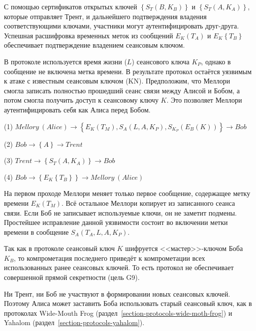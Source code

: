 С помощью сертификатов открытых ключей $\left\{ S_T \left( B, K_B \right) \right\}$ и $\left\{ S_T \left( A, K_A \right) \right\}$, которые отправляет Трент, и дальнейшего подтверждения владения соответствующими ключами, участники могут аутентифицировать друг-друга. Успешная расшифровка временных меток из сообщений $E_K \left( T_A \right)$ и $E_K \left\{ T_B \right\}$ обеспечивает подтверждение владением сеансовым ключом.

В протоколе используется время жизни ($L$) сеансового ключа $K_P$, однако в сообщение не включена метка времени. В результате протокол остаётся уязвимым к атаке с известным сеансовым ключом (KN). Предположим, что Меллори смогла записать полностью прошедший сеанс связи между Алисой и Бобом, а потом смогла получить доступ к сеансовому ключу $K$. Это позволяет Меллори аутентифицировать себя как Алиса перед Бобом.

\begin{protocol}
    \item[(1)] $Mellory~(Alice) \to \left\{ E_K \left( T_M \right), S_A \left( L, A, K_P \right), S_{K_P} \left( E_B \left( K \right) \right) \right\} \to Bob$
    \item[(2)] $Bob \to \left\{ A \right\} \to Trent$
    \item[(3)] $Trent \to \left\{ S_T \left( A, K_A \right) \right\} \to Bob$
    \item[(4)] $Bob \to \left\{ E_K \left\{ T_B \right\} \right\} \to Mellory~(Alice)$
\end{protocol}

На первом проходе Меллори меняет только первое сообщение, содержащее метку времени $E_K \left( T_M \right)$. Всё остальное Меллори копирует из записанного сеанса связи. Если Боб не записывает используемые ключи, он не заметит подмены. Простейшее исправление данной уязвимости состоит во включении метки времени в сообщение $S_A \left( T_A, L, A, K_P \right)$.

Так как в протоколе сеансовый ключ $K$ шифруется <<мастер>>-ключом Боба $K_B$, то компрометация последнего приведёт к компрометации всех использованных ранее сеансовых ключей. То есть протокол не обеспечивает совершенной прямой секретности (цель G9).

Ни Трент, ни Боб не участвуют в формировании новых сеансовых ключей. Поэтому Алиса может заставить Боба использовать старый сеансовый ключ, как в протоколах Wide-Mouth Frog (раздел~\ref{section-protocols-wide-moth-frog}) и Yahalom (раздел~\ref{section-protocols-yahalom}).

